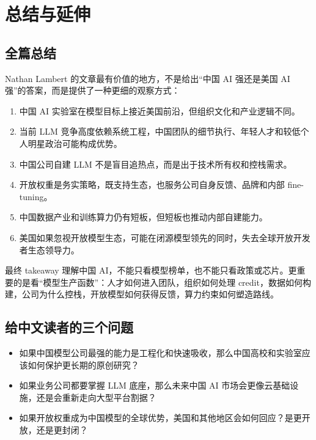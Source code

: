 \section{总结与延伸}

\subsection{全篇总结}

Nathan Lambert 的文章最有价值的地方，不是给出``中国 AI 强还是美国 AI 强''的答案，而是提供了一种更细的观察方式：

\begin{enumerate}[leftmargin=1.5em]
    \item 中国 AI 实验室在模型目标上接近美国前沿，但组织文化和产业逻辑不同。
    \item 当前 LLM 竞争高度依赖系统工程，中国团队的细节执行、年轻人才和较低个人明星政治可能构成优势。
    \item 中国公司自建 LLM 不是盲目追热点，而是出于技术所有权和控栈需求。
    \item 开放权重是务实策略，既支持生态，也服务公司自身反馈、品牌和内部 fine-tuning。
    \item 中国数据产业和训练算力仍有短板，但短板也推动内部自建能力。
    \item 美国如果忽视开放模型生态，可能在闭源模型领先的同时，失去全球开放开发者生态领导力。
\end{enumerate}

\begin{importantbox}{最终 takeaway}
理解中国 AI，不能只看模型榜单，也不能只看政策或芯片。更重要的是看``模型生产函数''：人才如何进入团队，组织如何处理 credit，数据如何构建，公司为什么控栈，开放模型如何获得反馈，算力约束如何塑造路线。
\end{importantbox}

\subsection{给中文读者的三个问题}

\begin{itemize}[leftmargin=1.5em]
    \item 如果中国模型公司最强的能力是工程化和快速吸收，那么中国高校和实验室应该如何保护更长期的原创研究？
    \item 如果业务公司都要掌握 LLM 底座，那么未来中国 AI 市场会更像云基础设施，还是会重新走向大型平台割据？
    \item 如果开放权重成为中国模型的全球优势，美国和其他地区会如何回应？是更开放，还是更封闭？
\end{itemize}


